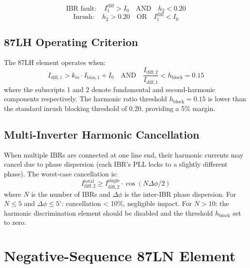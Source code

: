 \begin{equation}
  \text{IBR fault}: \quad I_1^\mathrm{diff} > I_0
  \quad\text{AND}\quad h_2 < 0.20
  \label{eq:ch4_87lh_ibr}
\end{equation}
\begin{equation}
  \text{Inrush}: \quad h_2 > 0.20
  \quad\text{OR}\quad I_1^\mathrm{diff} < I_0
  \label{eq:ch4_87lh_inrush}
\end{equation}

\subsection{87LH Operating Criterion}

The 87LH element operates when:
\begin{equation}
  I_\mathrm{diff,1} > k_m \cdot I_\mathrm{bias,1} + I_0
  \quad\text{AND}\quad \frac{I_\mathrm{diff,2}}{I_\mathrm{diff,1}} < h_\mathrm{block} = 0.15
  \label{eq:ch4_87lh_criterion}
\end{equation}
where the subscripts 1 and 2 denote fundamental and second-harmonic
components respectively. The harmonic ratio threshold $h_\mathrm{block} = 0.15$
is lower than the standard inrush blocking threshold of 0.20, providing
a 5\% margin.

\subsection{Multi-Inverter Harmonic Cancellation}

When multiple IBRs are connected at one line end, their harmonic currents
may cancel due to phase dispersion (each IBR's PLL locks to a slightly
different phase). The worst-case cancellation is:
\begin{equation}
  I_\mathrm{diff,2}^\mathrm{total} \geq I_\mathrm{diff,2}^\mathrm{single} \cdot \cos(N\Delta\phi/2)
  \label{eq:ch4_harmonic_cancel}
\end{equation}
where $N$ is the number of IBRs and $\Delta\phi$ is the inter-IBR phase
dispersion. For $N \leq 5$ and $\Delta\phi \leq 5^\circ{}$: cancellation < 10\%,
negligible impact. For $N > 10$: the harmonic discrimination element
should be disabled and the threshold $h_\mathrm{block}$ set to zero.

\section{Negative-Sequence 87LN Element}
\label{sec:ch4_87ln}

